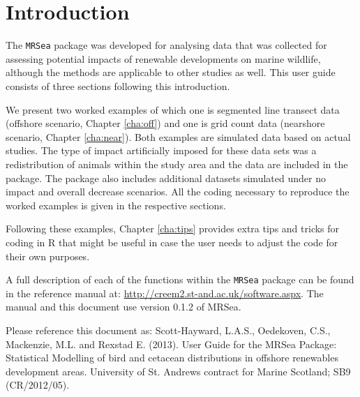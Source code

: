 \documentclass[11pt, a4paper]{report}
\begin{document}


\tableofcontents


\chapter{Introduction}
The {\tt MRSea} package was developed for analysing data that was collected for assessing potential impacts of renewable developments on marine wildlife, although the methods are applicable to other studies as well. This user guide consists of three sections following this introduction. 

\vspace{0.3cm}
We present two worked examples of which one is segmented line transect data (offshore scenario, Chapter \ref{cha:off}) and one is grid count data (nearshore scenario, Chapter \ref{cha:near}).  Both examples are simulated data based on actual studies. The type of impact artificially imposed for these data sets was a redistribution of animals within the study area and the data are included in the package. The package also includes additional datasets simulated under no impact and overall decrease scenarios. All the coding necessary to reproduce the worked examples is given in the respective sections. 

\vspace{0.3cm}
Following these examples, Chapter \ref{cha:tips} provides extra tips and tricks for coding in R that might be useful in case the user needs to adjust the code for their own purposes.

\vspace{0.3cm}
A full description of each of the functions within the {\tt MRSea} package can be found in the reference manual at: \href{http://creem2.st-and.ac.uk/software.aspx}{http://creem2.st-and.ac.uk/software.aspx}.  The manual and this document use version 0.1.2 of MRSea.

\vspace{0.3cm}
\begin{block}{Please reference this document as:}
\noindent Scott-Hayward, L.A.S., Oedekoven, C.S., Mackenzie, M.L. and Rexstad E. (2013). User Guide for the MRSea Package: Statistical Modelling of bird and cetacean distributions in offshore renewables development areas. University of St. Andrews contract for Marine Scotland; SB9 (CR/2012/05).
\end{block}

\newpage







\end{document}
